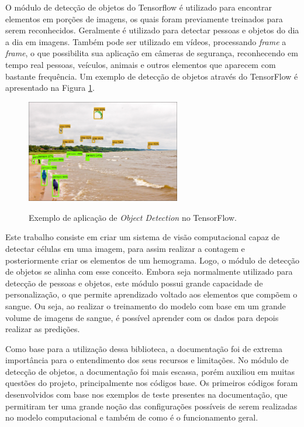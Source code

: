O módulo de detecção de objetos do Tensorflow é utilizado para encontrar elementos em porções de imagens, os quais foram previamente treinados para serem reconhecidos. Geralmente é utilizado para detectar pessoas e objetos do dia a dia em imagens. Também pode ser utilizado em vídeos, processando \emph{frame} a \emph{frame}, o que possibilita sua aplicação em câmeras de segurança, reconhecendo em tempo real pessoas, veículos, animais e outros elementos que aparecem com bastante frequência. Um exemplo de detecção de objetos através do TensorFlow é apresentado na Figura \ref{fig:objectdetection}.

\begin{figure}[!htb]
	\centering
	\caption{Exemplo de aplicação de \emph{Object Detection} no TensorFlow.}
	\includegraphics[width=0.60\textwidth]{img/objectdetection.jpg}
	\label{fig:objectdetection}
\end{figure}

Este trabalho consiste em criar um sistema de visão computacional capaz de detectar células em uma imagem, para assim realizar a contagem e posteriormente criar os elementos de um hemograma. Logo, o módulo de detecção de objetos se alinha com esse conceito. Embora seja normalmente utilizado para detecção de pessoas e objetos, este módulo possui grande capacidade de personalização, o que permite aprendizado voltado aos elementos que compõem o sangue. Ou seja, ao realizar o treinamento do modelo com base em um grande volume de imagens de sangue, é possível aprender com os dados para depois realizar as predições.

Como base para a utilização dessa biblioteca, a documentação foi de extrema importância para o entendimento dos seus recursos e limitações. No módulo de detecção de objetos, a documentação foi mais escassa, porém auxiliou em muitas questões do projeto, principalmente nos códigos base. Os primeiros códigos foram desenvolvidos com base nos exemplos de teste presentes na documentação, que permitiram ter uma grande noção das configurações possíveis de serem realizadas no modelo computacional e também de como é o funcionamento geral.

